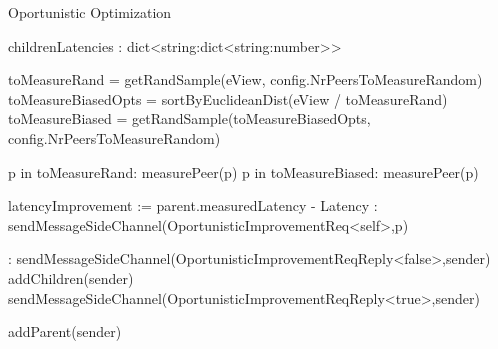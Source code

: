 \begin{algorithm}
\begin{algorithmic}[1]

        \caption{Oportunistic Optimization}

    \asdstate
        \State childrenLatencies : dict<string:dict<string:number>>
    \asdend

        \State toMeasureRand = getRandSample(eView, config.NrPeersToMeasureRandom)
        \State toMeasureBiasedOpts = sortByEuclideanDist(eView / toMeasureRand)
        \State toMeasureBiased = getRandSample(toMeasureBiasedOpts, config.NrPeersToMeasureRandom)

        \For p in toMeasureRand:
            \State measurePeer(p)
        \EndFor
        \For p in toMeasureBiased:
            \State measurePeer(p)
        \EndFor
    \asdend

        \State latencyImprovement := parent.measuredLatency - Latency
        :
            \State sendMessageSideChannel(OportunisticImprovementReq<self>,p)
        \EndIf
    \asdend


        :
            \State sendMessageSideChannel(OportunisticImprovementReqReply<false>,sender)
        \Else
            \State addChildren(sender)
            \State sendMessageSideChannel(OportunisticImprovementReqReply<true>,sender)
        \EndIf
    \asdend

            \State addParent(sender)
        \EndIf
    \asdend

\end{algorithmic}
\end{algorithm}